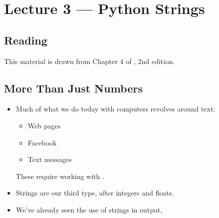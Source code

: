 \documentclass[letterpaper,10pt,english]{sphinxmanual}
\begin{document}
\chapter{Lecture 3 — Python Strings}
\label{\detokenize{lecture_notes/lec03_strings:lecture-3-python-strings}}\label{\detokenize{lecture_notes/lec03_strings::doc}}

\section{Reading}
\label{\detokenize{lecture_notes/lec03_strings:reading}}
This material is drawn from Chapter 4 of , 2nd
edition.


\section{More Than Just Numbers}
\label{\detokenize{lecture_notes/lec03_strings:more-than-just-numbers}}\begin{itemize}
\item {} 
Much of what we do today with computers revolves around text:
\begin{itemize}
\item {} 
Web pages

\item {} 
Facebook

\item {} 
Text messages

\end{itemize}

These require working with .

\item {} 
Strings are our third type, after integers and floats.

\item {} 
We’ve already seen the use of strings in output,

%
\begin{sphinxVerbatim}[commandchars=\\\{\}]
  
  
   
\end{sphinxVerbatim}

\end{itemize}
\end{document}
